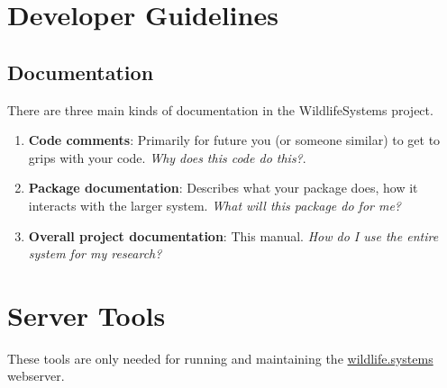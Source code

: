\documentclass[
]{book}
\newenvironment{Shaded}{\begin{snugshade}}{\end{snugshade}}
\newcommand{\CommentTok}[1]{\textcolor[rgb]{0.56,0.35,0.01}{\textit{#1}}}
\newcommand{\ControlFlowTok}[1]{\textcolor[rgb]{0.13,0.29,0.53}{\textbf{#1}}}
\newcommand{\DecValTok}[1]{\textcolor[rgb]{0.00,0.00,0.81}{#1}}
\newcommand{\ExtensionTok}[1]{#1}
\newcommand{\FunctionTok}[1]{\textcolor[rgb]{0.13,0.29,0.53}{\textbf{#1}}}
\newcommand{\KeywordTok}[1]{\textcolor[rgb]{0.13,0.29,0.53}{\textbf{#1}}}
\newcommand{\NormalTok}[1]{#1}
\newcommand{\OperatorTok}[1]{\textcolor[rgb]{0.81,0.36,0.00}{\textbf{#1}}}
\newcommand{\StringTok}[1]{\textcolor[rgb]{0.31,0.60,0.02}{#1}}
\newcommand{\VariableTok}[1]{\textcolor[rgb]{0.00,0.00,0.00}{#1}}
\begin{document}
\begin{Shaded}
\end{Shaded}

\chapter{Developer Guidelines}\label{developer-guidelines}

\section{Documentation}\label{documentation}

There are three main kinds of documentation in the WildlifeSystems project.

\begin{enumerate}
\def\labelenumi{\arabic{enumi}.}
\item
  \textbf{Code comments}: Primarily for future you (or someone similar) to get to grips with your code. \emph{Why does this code do this?}.
\item
  \textbf{Package documentation}: Describes what your package does, how it interacts with the larger system. \emph{What will this package do for me?}
\item
  \textbf{Overall project documentation}: This manual. \emph{How do I use the entire system for my research?}
\end{enumerate}

\chapter{Server Tools}\label{server-tools}

These tools are only needed for running and maintaining the \href{https://wildlife.systems}{wildlife.systems} webserver.
\end{document}
